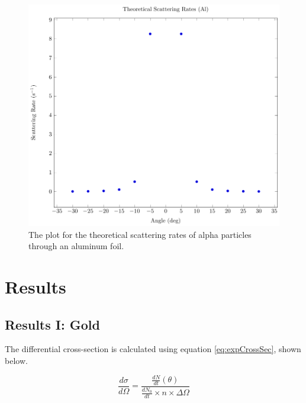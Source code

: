 \documentclass[a4paper]{article}
\begin{document}
\begin{figure}[H]
  \begin{center}
    \includegraphics[scale=0.8]{Plots/TheoreticalScatteringRatesAl/theoScatRatesAl.pdf}
  \end{center}
  \caption{The plot for the theoretical scattering rates of alpha particles
    through an aluminum foil.}
  \label{gph:theoScatRateAl}
\end{figure}

\section{Results}

\subsection{Results I: Gold}

\qq 

\qq 

\qq The differential cross-section is calculated using equation \ref{eq:expCrossSec}, shown below.

\begin{equation} \label{eq:expCrossSec}
 \frac{d \sigma}{d \Omega} = \frac
                                 {
								  \frac{dN}{dt} ( \theta )
								}
								{
								  \frac{dN_0}{dt} 
								  \times n
								  \times \Delta \Omega
                                 }
\end{equation}
\end{document}
